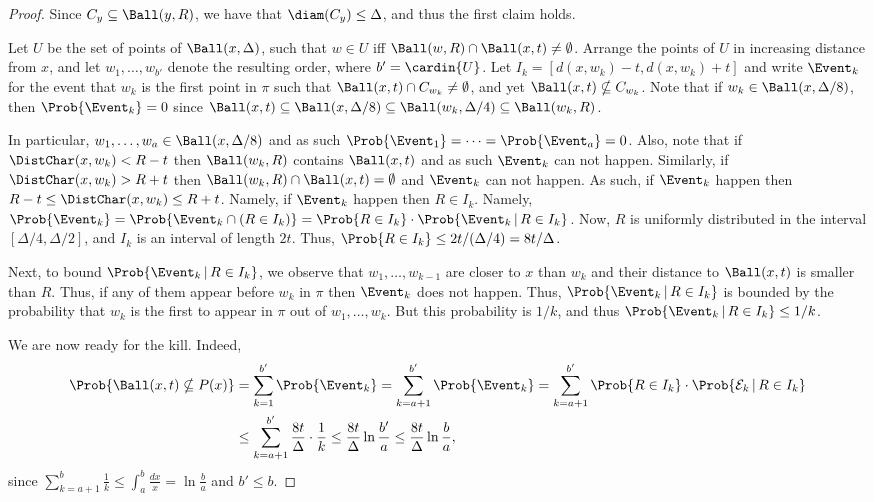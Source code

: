 \begin{proof}
    Since $C_y \subseteq \Ball(y, R)$, we have that $\diam(C_y) \leq
    \Delta$, and thus the first claim holds.
        
    Let $U$ be the set of points of $\Ball(x, \Delta)$, such that $w
    \in U$ iff $\Ball(w,R) \cap \Ball(x,t) \ne \emptyset$.  Arrange
    the points of $U$ in increasing distance from $x$, and let $w_1,
    \ldots, w_{b'}$ denote the resulting order, where $b'=
    \cardin{U}$.  Let $I_k = [d(x, w_k)-t, d(x,w_k)+t]$ and write
    $\Event_k$ for the event that $w_k$ is the first point in $\pi$
    such that $\Ball(x,t) \cap C_{w_k} \neq \emptyset$, and yet
    $\Ball(x,t) \nsubseteq C_{w_k}$.  Note that if $w_k \in \Ball(x,
    \Delta/8)$, then $\Prob{\Event_k} = 0$ since $\Ball(x, t)
    \subseteq \Ball(x, \Delta/8) \subseteq \Ball(w_k, \Delta/4)
    \subseteq \Ball(w_k, R)$.
    
    In particular, $w_1, \ldots, w_a \in \Ball(x,\Delta/8)$ and as
    such $\Prob{ \Event_1} = \cdots = \Prob{ \Event_a} = 0$.  Also,
    note that if $\DistChar(x, w_k)< R- t$ then $\Ball(w_k, R)$ contains
    $\Ball(x, t)$ and as such $\Event_k$ can not happen. Similarly, if
    $\DistChar(x, w_k) > R + t$ then $\Ball(w_k, R) \cap \Ball(x, t) =
    \emptyset$ and $\Event_k$ can not happen. As such, if $\Event_k$
    happen then $R-t \leq \DistChar(x,w_k) \leq R+t$. Namely, if
    $\Event_k$ happen then $R \in I_k$. Namely, $\Prob{ \Event_k } =
    \Prob{ \Event_k \cap (R \in I_k) } = \Prob{R \in I_k} \cdot \Prob{
       \Event_k\,|\,R \in I_k}$. Now, $R$ is uniformly distributed in
    the interval $[\Delta/4, \Delta/2]$, and $I_k$ is an interval of
    length $2t$. Thus, $\Prob{R \in I_k} \leq 2t/(\Delta/4) =
    8t/\Delta$. 
    
    Next, to bound $\Prob{ \Event_k\,|\,R \in I_k}$, we observe that
    $w_1, \ldots, w_{k-1}$ are closer to $x$ than $w_k$ and their
    distance to $\Ball(x,t)$ is smaller than $R$. Thus, if any of them
    appear before $w_k$ in $\pi$ then $\Event_k$ does not
    happen. Thus, $\Prob{ \Event_k\,|\,R \in I_k}$ is bounded by the
    probability that $w_k$ is the first to appear in $\pi$ out of
    $w_1, \ldots, w_k$. But this probability is $1/k$, and thus
    $\Prob{ \Event_k\,|\,R \in I_k} \leq 1/k$.
    
    We are now ready for the kill. Indeed,
    \begin{align*}
      \Prob{\Ball(x,t) \nsubseteq P(x)}%
      &=%
        \sum_{k=1}^{b'} \Prob{\Event_k} = \sum_{k=a+1}^{b'} \Prob{\Event_k}
        =%
        \sum_{k=a+1}^{b'} \Prob{R \in I_k} \cdot \Prob{\mathcal
        E_k\,|\,R \in I_k}     %
      \\&
      \leq%
      \sum_{k=a+1}^{b'} \frac{8t}{\Delta} \cdot \frac{1}{k}%
      \leq%
      \frac{8t}{\Delta} \ln \frac{b'}{a}%
      \leq%
      \frac{8t}{\Delta} \ln \frac{b}{a},
    \end{align*}
    since $\sum_{k=a+1}^b \frac{1}{k} \leq \int_{a}^b \frac{dx}{x} =
    \ln \frac{b}{a}$ and $b' \leq b$.
\end{proof}


